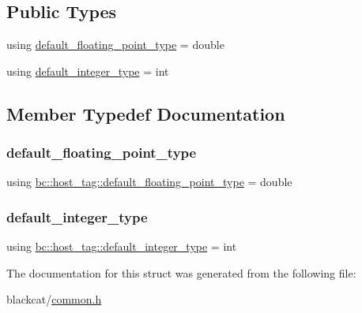 \subsection*{Public Types}
\begin{DoxyCompactItemize}
\item 
using \hyperlink{structbc_1_1host__tag_a3a077e5d182f39ce0ec5348e87f8a3b4}{default\+\_\+floating\+\_\+point\+\_\+type} = double
\item 
using \hyperlink{structbc_1_1host__tag_a6fef6c33463875f632625a010660582c}{default\+\_\+integer\+\_\+type} = int
\end{DoxyCompactItemize}


\subsection{Member Typedef Documentation}
\mbox{\label{structbc_1_1host__tag_a3a077e5d182f39ce0ec5348e87f8a3b4}} 
\subsubsection{\texorpdfstring{default\+\_\+floating\+\_\+point\+\_\+type}{default\_floating\_point\_type}}
{\footnotesize\ttfamily using \hyperlink{structbc_1_1host__tag_a3a077e5d182f39ce0ec5348e87f8a3b4}{bc\+::host\+\_\+tag\+::default\+\_\+floating\+\_\+point\+\_\+type} =  double}

\mbox{\label{structbc_1_1host__tag_a6fef6c33463875f632625a010660582c}} 
\subsubsection{\texorpdfstring{default\+\_\+integer\+\_\+type}{default\_integer\_type}}
{\footnotesize\ttfamily using \hyperlink{structbc_1_1host__tag_a6fef6c33463875f632625a010660582c}{bc\+::host\+\_\+tag\+::default\+\_\+integer\+\_\+type} =  int}



The documentation for this struct was generated from the following file\+:\begin{DoxyCompactItemize}
\item 
blackcat/\hyperlink{common_8h}{common.\+h}\end{DoxyCompactItemize}
